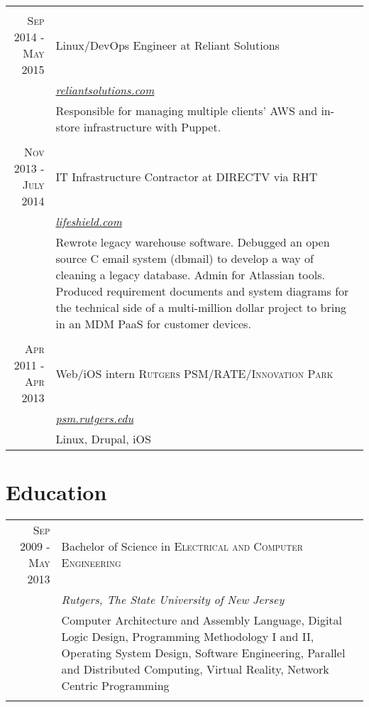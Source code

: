 \documentclass[a4paper, 10pt, onepage]{article} %
\begin{document}
\begin{tabular}{r|p{10cm}}
\multicolumn{2}{c}{}\\
\textsc{Sep 2014 - May 2015} & {Linux/DevOps Engineer at Reliant Solutions}\\
&\small\emph{\href{https://reliantsolutions.com}{reliantsolutions.com}}\\
&\footnotesize{Responsible for managing multiple clients' AWS and in-store infrastructure with Puppet.}\\

\multicolumn{2}{c}{}\\
\textsc{Nov 2013 - July 2014} & {IT Infrastructure Contractor at DIRECTV via RHT}\\
&\small\emph{\href{https://lifeshield.com}{lifeshield.com}}\\
&\footnotesize{Rewrote legacy warehouse software. Debugged an open source C email system (dbmail) to develop a way of cleaning a legacy database. Admin for Atlassian tools. Produced requirement documents and system diagrams for the technical side of a multi-million dollar project to bring in an MDM PaaS for customer devices.}\\

\multicolumn{2}{c}{}\\
\textsc{Apr 2011 - Apr 2013} & Web/iOS intern \textsc{Rutgers PSM/RATE/Innovation Park}\\
& \small\emph{\href{https://psm.rutgers.edu}{psm.rutgers.edu}}\\
& \footnotesize{Linux, Drupal, iOS}\\
\end{tabular}

\section{Education}
\begin{tabular}{r|p{10cm}}
\textsc{Sep 2009 - May 2013} & Bachelor of Science in \textsc{Electrical and Computer Engineering}\\
& \small\emph{Rutgers, The State University of New Jersey}\\
& \footnotesize{Computer Architecture and Assembly Language, Digital Logic Design, Programming Methodology I and II, Operating System Design, Software Engineering, Parallel and Distributed Computing, Virtual Reality, Network Centric Programming}\\
\multicolumn{2}{c}{}\\
\end{tabular}
\end{document}
